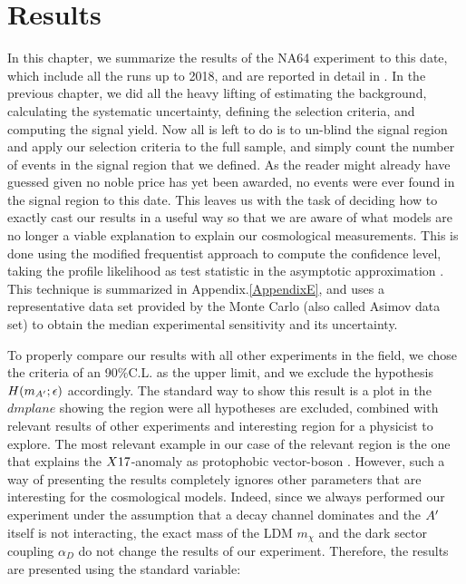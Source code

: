 
\newcommand{\pdirfour}{chapters/plots/chapter4}

\chapter{Results} %

\label{chapter4} %

In this chapter, we summarize the results of the NA64 experiment to this date, which include all the runs up to 2018, and are reported in detail in \cite{Banerjee:2020fue,Banerjee:2019hmi,NA64:2019imj,na64-prd,Banerjee:2018vgk,Banerjee:2016tad}. In the previous chapter, we did all the heavy lifting of estimating the background, calculating the systematic uncertainty, defining the selection criteria, and computing the signal yield. Now all is left to do is to un-blind the signal region and apply our selection criteria to the full sample, and simply count the number of events in the signal region that we defined. As the reader might already have guessed given no noble price has yet been awarded, no events were ever found in the signal region to this date. This leaves us with the task of deciding how to exactly cast our results in a useful way so that we are aware of what models are no longer a viable explanation to explain our cosmological measurements. This is done using the modified frequentist approach to compute the confidence level, taking the profile likelihood as test statistic in the asymptotic approximation \cite{Read_2002,JUNK1999435,Cowan:2010js}. This technique is summarized in Appendix.\ref{AppendixE}, and uses a representative data set provided by the Monte Carlo (also called Asimov data set) to obtain the median experimental sensitivity and its uncertainty.

To properly compare our results with all other experiments in the field, we chose the criteria of an 90\%C.L. as the upper limit, and we exclude the hypothesis $H(m_{A'};\epsilon)$ accordingly. The standard way to show this result is a plot in the $dmplane$ showing the region were all hypotheses are excluded, combined with relevant results of other experiments and interesting region for a physicist to explore. The most relevant example in our case of the relevant region is the one that explains the $X17$-anomaly as protophobic vector-boson \cite{PhysRevD.95.035017}. However, such a way of presenting the results completely ignores other parameters that are interesting for the cosmological models. Indeed, since we always performed our experiment under the assumption that a decay channel dominates and the $A'$ itself is not interacting, the exact mass of the LDM $m_{\chi}$ and the dark sector coupling $\alpha_D$ do not change the results of our experiment. Therefore, the results are presented using the standard variable:

